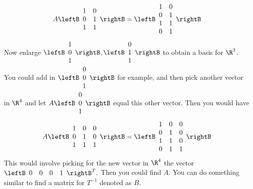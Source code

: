 \begin{enumialphparenastyle}
\begin{ex}
\begin{equation*}
A\leftB 
\begin{array}{cc}
1 & 0 \\ 
0 & 1 \\ 
1 & 1
\end{array}
\rightB =\leftB 
\begin{array}{cc}
1 & 0 \\ 
0 & 1 \\ 
1 & 1 \\ 
0 & 1
\end{array}
\rightB
\end{equation*}
Now enlarge $\leftB 
\begin{array}{c}
1 \\ 
0 \\ 
1
\end{array}
\rightB ,\leftB 
\begin{array}{c}
0 \\ 
1 \\ 
1
\end{array}
\rightB $ to obtain a basis for $\R^{3}$. You could add in $\leftB 
\begin{array}{c}
0 \\ 
0 \\ 
1
\end{array}
\rightB $ for example, and then pick another vector in $\R^{4}$ and
let $A\leftB 
\begin{array}{c}
0 \\ 
0 \\ 
1
\end{array}
\rightB $ equal this other vector. Then you would have 
\begin{equation*}
A\leftB 
\begin{array}{ccc}
1 & 0 & 0 \\ 
0 & 1 & 0 \\ 
1 & 1 & 1
\end{array}
\rightB =\leftB 
\begin{array}{ccc}
1 & 0 & 0 \\ 
0 & 1 & 0 \\ 
1 & 1 & 0 \\ 
0 & 1 & 1
\end{array}
\rightB
\end{equation*}
This would involve picking for the new vector in $\R^{4}$ the vector 
$\leftB 
\begin{array}{cccc}
0 & 0 & 0 & 1
\end{array}
\rightB ^{T}.$ Then you could find $A$. You can do something similar to find
a matrix for $T^{-1}$ denoted as $B$.
\end{ex}

\end{enumialphparenastyle}